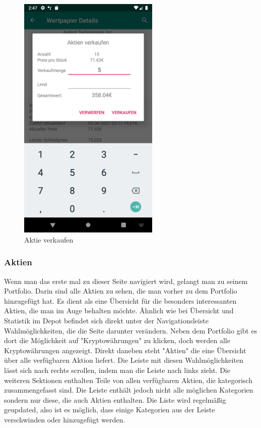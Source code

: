\documentclass[10pt]{scrartcl}
\begin{document}
\begin{figure}[H]
	\centering
	\includegraphics[width=0.6\textwidth]{Bilder/Applikation/AktieVerkaufen.png}
	\caption{Aktie verkaufen}
\end{figure}

\subsubsection{Aktien}
Wenn man das erste mal zu dieser Seite navigiert wird, gelangt man zu seinem Portfolio. Darin sind alle Aktien zu sehen, die man vorher zu dem Portfolio hinzugefügt hat. Es dient als eine Übersicht für die besonders interessanten Aktien, die man im Auge behalten möchte. Ähnlich wie bei Übersicht und Statistik im Depot befindet sich direkt unter der Navigationsleiste Wahlmöglichkeiten, die die Seite darunter verändern. Neben dem Portfolio gibt es dort die Möglichkeit auf "Kryptowährungen" zu klicken, doch werden alle Kryptowährungen angezeigt. Direkt daneben steht "Aktien" die eine Übersicht über alle verfügbaren Aktion liefert. Die Leiste mit diesen Wahlmöglichkeiten lässt sich nach rechts scrollen, indem man die Leiste nach links zieht. Die weiteren Sektionen enthalten Teile von allen verfügbaren Aktien, die kategorisch zusammengefasst sind. Die Leiste enthält jedoch nicht alle möglichen Kategorien sondern nur diese, die auch Aktien enthalten. Die Liste wird regelmäßig geupdated, also ist es möglich, dass einige Kategorien aus der Leiste verschwinden oder hinzugefügt werden.
\end{document}
